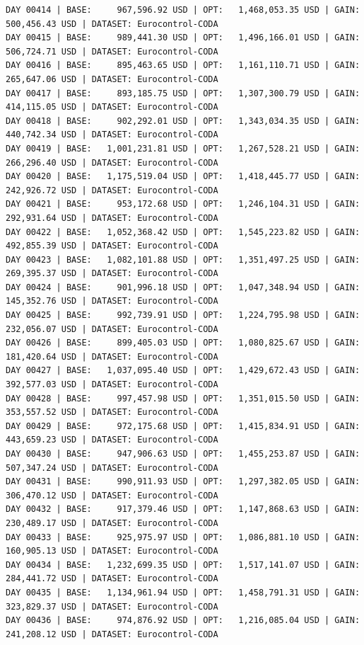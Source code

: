 \documentclass[11pt,a4paper]{article}
\begin{document}
\begin{verbatim}
DAY 00414 | BASE:     967,596.92 USD | OPT:   1,468,053.35 USD | GAIN: 500,456.43 USD | DATASET: Eurocontrol-CODA
DAY 00415 | BASE:     989,441.30 USD | OPT:   1,496,166.01 USD | GAIN: 506,724.71 USD | DATASET: Eurocontrol-CODA
DAY 00416 | BASE:     895,463.65 USD | OPT:   1,161,110.71 USD | GAIN: 265,647.06 USD | DATASET: Eurocontrol-CODA
DAY 00417 | BASE:     893,185.75 USD | OPT:   1,307,300.79 USD | GAIN: 414,115.05 USD | DATASET: Eurocontrol-CODA
DAY 00418 | BASE:     902,292.01 USD | OPT:   1,343,034.35 USD | GAIN: 440,742.34 USD | DATASET: Eurocontrol-CODA
DAY 00419 | BASE:   1,001,231.81 USD | OPT:   1,267,528.21 USD | GAIN: 266,296.40 USD | DATASET: Eurocontrol-CODA
DAY 00420 | BASE:   1,175,519.04 USD | OPT:   1,418,445.77 USD | GAIN: 242,926.72 USD | DATASET: Eurocontrol-CODA
DAY 00421 | BASE:     953,172.68 USD | OPT:   1,246,104.31 USD | GAIN: 292,931.64 USD | DATASET: Eurocontrol-CODA
DAY 00422 | BASE:   1,052,368.42 USD | OPT:   1,545,223.82 USD | GAIN: 492,855.39 USD | DATASET: Eurocontrol-CODA
DAY 00423 | BASE:   1,082,101.88 USD | OPT:   1,351,497.25 USD | GAIN: 269,395.37 USD | DATASET: Eurocontrol-CODA
DAY 00424 | BASE:     901,996.18 USD | OPT:   1,047,348.94 USD | GAIN: 145,352.76 USD | DATASET: Eurocontrol-CODA
DAY 00425 | BASE:     992,739.91 USD | OPT:   1,224,795.98 USD | GAIN: 232,056.07 USD | DATASET: Eurocontrol-CODA
DAY 00426 | BASE:     899,405.03 USD | OPT:   1,080,825.67 USD | GAIN: 181,420.64 USD | DATASET: Eurocontrol-CODA
DAY 00427 | BASE:   1,037,095.40 USD | OPT:   1,429,672.43 USD | GAIN: 392,577.03 USD | DATASET: Eurocontrol-CODA
DAY 00428 | BASE:     997,457.98 USD | OPT:   1,351,015.50 USD | GAIN: 353,557.52 USD | DATASET: Eurocontrol-CODA
DAY 00429 | BASE:     972,175.68 USD | OPT:   1,415,834.91 USD | GAIN: 443,659.23 USD | DATASET: Eurocontrol-CODA
DAY 00430 | BASE:     947,906.63 USD | OPT:   1,455,253.87 USD | GAIN: 507,347.24 USD | DATASET: Eurocontrol-CODA
DAY 00431 | BASE:     990,911.93 USD | OPT:   1,297,382.05 USD | GAIN: 306,470.12 USD | DATASET: Eurocontrol-CODA
DAY 00432 | BASE:     917,379.46 USD | OPT:   1,147,868.63 USD | GAIN: 230,489.17 USD | DATASET: Eurocontrol-CODA
DAY 00433 | BASE:     925,975.97 USD | OPT:   1,086,881.10 USD | GAIN: 160,905.13 USD | DATASET: Eurocontrol-CODA
DAY 00434 | BASE:   1,232,699.35 USD | OPT:   1,517,141.07 USD | GAIN: 284,441.72 USD | DATASET: Eurocontrol-CODA
DAY 00435 | BASE:   1,134,961.94 USD | OPT:   1,458,791.31 USD | GAIN: 323,829.37 USD | DATASET: Eurocontrol-CODA
DAY 00436 | BASE:     974,876.92 USD | OPT:   1,216,085.04 USD | GAIN: 241,208.12 USD | DATASET: Eurocontrol-CODA

\end{verbatim}
\end{document}
